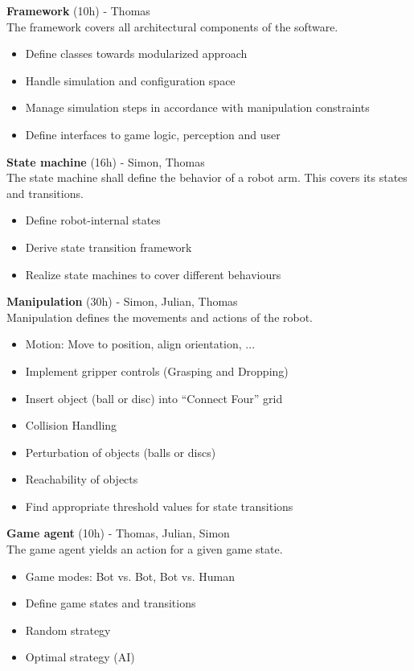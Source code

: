 \documentclass[11pt,pdftex,a4paper]{article}
\begin{document}
	\noindent
	\textbf{Framework} (10h) - Thomas\\
	The framework covers all architectural components of the software.
	\begin{itemize}
	\item Define classes towards modularized approach
	\item Handle simulation and configuration space
	\item Manage simulation steps in accordance with manipulation constraints
	\item Define interfaces to game logic, perception and user
	\end{itemize}
	
	\noindent
	\textbf{State machine} (16h) - Simon, Thomas\\
	The state machine shall define the behavior of a robot arm. This covers its states and transitions.
	\begin{itemize}
	\item Define robot-internal states
	\item Derive state transition framework
	\item Realize state machines to cover different behaviours 
	\end{itemize}
	
	\noindent
	\textbf{Manipulation} (30h) - Simon, Julian, Thomas\\
	Manipulation defines the movements and actions of the robot.
	\begin{itemize}
	\item Motion: Move to position, align orientation, ...
	\item Implement gripper controls (Grasping and Dropping)
	\item Insert object (ball or disc) into ``Connect Four'' grid
	\item Collision Handling
	\item Perturbation of objects (balls or discs) 
	\item Reachability of objects
	\item Find appropriate threshold values for state transitions
	\end{itemize}
	
	\noindent
	\textbf{Game agent} (10h) - Thomas, Julian, Simon\\
	The game agent yields an action for a given game state.
	\begin{itemize}
	\item Game modes: Bot vs. Bot, Bot vs. Human
	\item Define game states and transitions
	\item Random strategy
	\item Optimal strategy (AI)
	\end{itemize}
	
\end{document}
